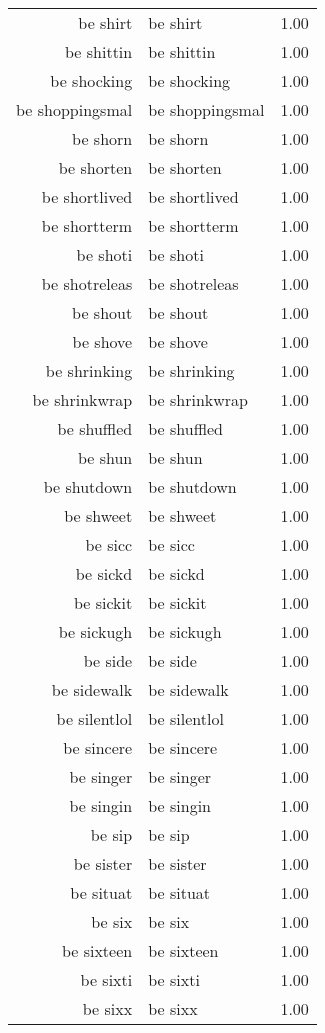 \begin{table}[ht]
\begin{tabular}{rlr}
  be shirt & be shirt & 1.00 \\ 
  be shittin & be shittin & 1.00 \\ 
  be shocking & be shocking & 1.00 \\ 
  be shoppingsmal & be shoppingsmal & 1.00 \\ 
  be shorn & be shorn & 1.00 \\ 
  be shorten & be shorten & 1.00 \\ 
  be shortlived & be shortlived & 1.00 \\ 
  be shortterm & be shortterm & 1.00 \\ 
  be shoti & be shoti & 1.00 \\ 
  be shotreleas & be shotreleas & 1.00 \\ 
  be shout & be shout & 1.00 \\ 
  be shove & be shove & 1.00 \\ 
  be shrinking & be shrinking & 1.00 \\ 
  be shrinkwrap & be shrinkwrap & 1.00 \\ 
  be shuffled & be shuffled & 1.00 \\ 
  be shun & be shun & 1.00 \\ 
  be shutdown & be shutdown & 1.00 \\ 
  be shweet & be shweet & 1.00 \\ 
  be sicc & be sicc & 1.00 \\ 
  be sickd & be sickd & 1.00 \\ 
  be sickit & be sickit & 1.00 \\ 
  be sickugh & be sickugh & 1.00 \\ 
  be side & be side & 1.00 \\ 
  be sidewalk & be sidewalk & 1.00 \\ 
  be silentlol & be silentlol & 1.00 \\ 
  be sincere & be sincere & 1.00 \\ 
  be singer & be singer & 1.00 \\ 
  be singin & be singin & 1.00 \\ 
  be sip & be sip & 1.00 \\ 
  be sister & be sister & 1.00 \\ 
  be situat & be situat & 1.00 \\ 
  be six & be six & 1.00 \\ 
  be sixteen & be sixteen & 1.00 \\ 
  be sixti & be sixti & 1.00 \\ 
  be sixx & be sixx & 1.00 \\ 

\end{tabular}
\end{table}

